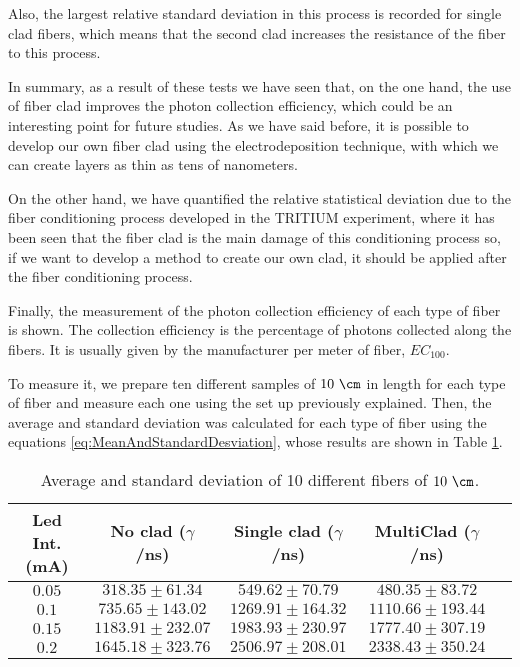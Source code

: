 Also, the largest relative standard deviation in this process is recorded for single clad fibers, which means that the second clad increases the resistance of the fiber to this process.

In summary, as a result of these tests we have seen that, on the one hand, the use of fiber clad improves the photon collection efficiency, which could be an interesting point for future studies. As we have said before, it is possible to develop our own fiber clad using the electrodeposition technique, with which we can create layers as thin as tens of nanometers.

On the other hand, we have quantified the relative statistical deviation due to the fiber conditioning process developed in the TRITIUM experiment, where it has been seen that the fiber clad is the main damage of this conditioning process so, if we want to develop a method to create our own clad, it should be applied after the fiber conditioning process.

Finally, the measurement of the photon collection efficiency of each type of fiber is shown. The collection efficiency is the percentage of photons collected along the fibers. It is usually given by the manufacturer per meter of fiber, $ EC_ {100} $.

To measure it, we prepare ten different samples of $10~\cm$ in length for each type of fiber and measure each one using the set up previously explained. Then, the average and standard deviation was calculated for each type of fiber using the equations \ref{eq:MeanAndStandardDesviation}, whose results are shown in Table \ref{tab:10DifferentSamplesAlltypes}.

\begin{table}[htbp]
\begin{center}
\begin{tabular}{|c|c|c|c|c|}
\hline
Led Int. (mA) & No clad ($\gamma$/ns) & Single clad ($\gamma$/ns) & MultiClad ($\gamma$/ns) \\
\hline \hline \hline
$0.05$ & $318.35 \pm 61.34$ & $549.62 \pm 70.79$ & $480.35 \pm 83.72$ \\ \hline
$0.1$ & $735.65 \pm 143.02$ & $1269.91 \pm 164.32$ & $1110.66 \pm 193.44$ \\ \hline
$0.15$ & $1183.91 \pm 232.07$ & $1983.93 \pm 230.97$ & $1777.40\pm 307.19$ \\ \hline
$0.2$ & $1645.18 \pm 323.76$ & $2506.97 \pm 208.01$ & $2338.43 \pm 350.24$ \\ \hline
\end{tabular}
\caption{Average and standard deviation of 10 different fibers of $10~\cm$.}
\label{tab:10DifferentSamplesAlltypes}
\end{center}
\end{table}

